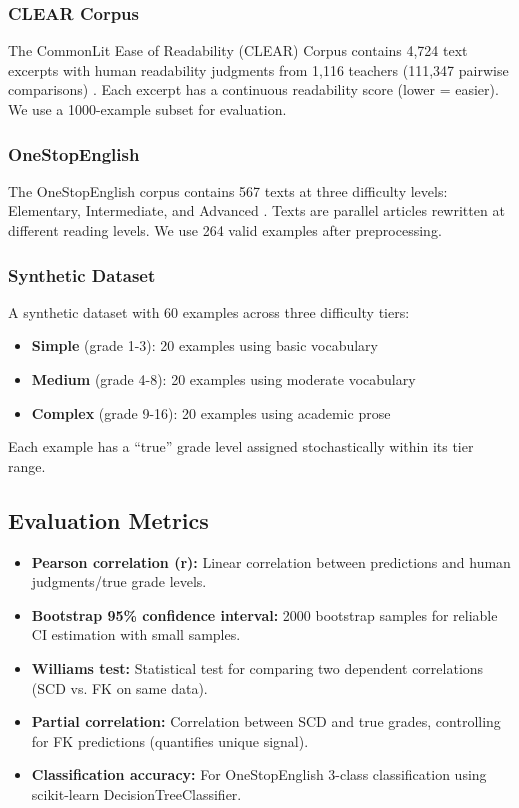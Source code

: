 \documentclass[11pt,letterpaper]{article}
\begin{document}
\subsubsection{CLEAR Corpus}

The CommonLit Ease of Readability (CLEAR) Corpus contains 4,724 text excerpts with human readability judgments from 1,116 teachers (111,347 pairwise comparisons) \cite{Crossley2021}. Each excerpt has a continuous readability score (lower = easier). We use a 1000-example subset for evaluation.

\subsubsection{OneStopEnglish}

The OneStopEnglish corpus contains 567 texts at three difficulty levels: Elementary, Intermediate, and Advanced \cite{Vajjala2018}. Texts are parallel articles rewritten at different reading levels. We use 264 valid examples after preprocessing.

\subsubsection{Synthetic Dataset}

A synthetic dataset with 60 examples across three difficulty tiers:
\begin{itemize}
  \item \textbf{Simple} (grade 1-3): 20 examples using basic vocabulary
  \item \textbf{Medium} (grade 4-8): 20 examples using moderate vocabulary
  \item \textbf{Complex} (grade 9-16): 20 examples using academic prose
\end{itemize}

Each example has a ``true'' grade level assigned stochastically within its tier range.

\subsection{Evaluation Metrics}

\begin{itemize}
  \item \textbf{Pearson correlation (r):} Linear correlation between predictions and human judgments/true grade levels.
  \item \textbf{Bootstrap 95\% confidence interval:} 2000 bootstrap samples for reliable CI estimation with small samples.
  \item \textbf{Williams test:} Statistical test for comparing two dependent correlations (SCD vs. FK on same data).
  \item \textbf{Partial correlation:} Correlation between SCD and true grades, controlling for FK predictions (quantifies unique signal).
  \item \textbf{Classification accuracy:} For OneStopEnglish 3-class classification using scikit-learn DecisionTreeClassifier.
\end{itemize}
\end{document}
